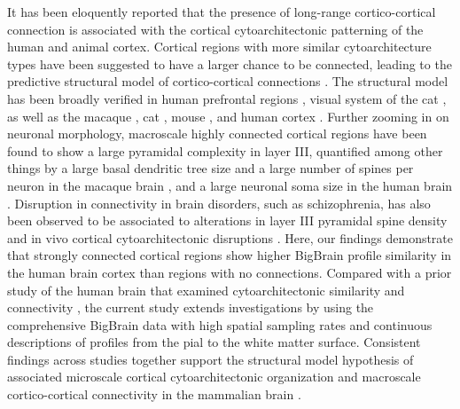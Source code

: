 \begin{refsection}
It has been eloquently reported that the presence of long-range cortico-cortical connection is associated with the cortical cytoarchitectonic patterning of the human and animal cortex. Cortical regions with more similar cytoarchitecture types have been suggested to have a larger chance to be connected, leading to the predictive structural model of cortico-cortical connections \citep{barbas2015general}. The structural model has been broadly verified in human prefrontal regions \citep{Barbas2005ParallelOO}, visual system of the cat \citep{Hilgetag2010CytoarchitecturalDA}, as well as the macaque \citep{beul2017predictive}, cat \citep{beul2015predictive}, mouse \citep{goulas2017principles}, and human cortex \citep{goulas2016cytoarchitectonic}. Further zooming in on neuronal morphology, macroscale highly connected cortical regions have been found to show a large pyramidal complexity in layer III, quantified among other things by a large basal dendritic tree size and a large number of spines per neuron in the macaque brain \citep{scholtens2014linking}, and a large neuronal soma size in the human brain \citep{van2015bridging}. Disruption in connectivity in brain disorders, such as schizophrenia, has also been observed to be associated to alterations in layer III pyramidal spine density \citep{VANDENHEUVEL2016293} and in vivo cortical cytoarchitectonic disruptions \citep{Wei2018CorticalMT}. Here, our findings demonstrate that strongly connected cortical regions show higher BigBrain profile similarity in the human brain cortex than regions with no connections. Compared with a prior study of the human brain that examined cytoarchitectonic similarity and connectivity \citep{goulas2016cytoarchitectonic}, the current study extends investigations by using the comprehensive BigBrain data with high spatial sampling rates and continuous descriptions of profiles from the pial to the white matter surface. Consistent findings across studies together support the structural model hypothesis of associated microscale cortical cytoarchitectonic organization and macroscale cortico-cortical connectivity in the mammalian brain \citep{barbas2015general,Barbas2005ParallelOO,beul2017predictive,beul2015predictive,goulas2016cytoarchitectonic,goulas2017principles,Hilgetag2010CytoarchitecturalDA}.\\


\end{refsection}
